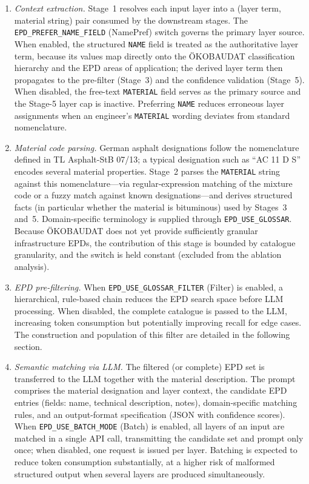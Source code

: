 \documentclass[10pt, a4paper, twocolumn]{article}
\begin{document}
\begin{enumerate}[leftmargin=*, itemsep=3pt, topsep=3pt, label=\arabic*.]

\item \textit{Context extraction.} Stage~1 resolves each input layer into a
(layer term, material string) pair consumed by the downstream stages. The
\texttt{EPD\_PREFER\_NAME\_FIELD} (NamePref) switch governs the primary layer
source. When enabled, the structured \texttt{NAME} field is treated as the
authoritative layer term, because its values map directly onto the
\"OKOBAUDAT classification hierarchy and the EPD areas of application; the
derived layer term then propagates to the pre-filter (Stage~3) and the
confidence validation (Stage~5). When disabled, the free-text \texttt{MATERIAL}
field serves as the primary source and the Stage-5 layer cap is inactive.
Preferring \texttt{NAME} reduces erroneous layer assignments when an engineer's
\texttt{MATERIAL} wording deviates from standard nomenclature.

\item \textit{Material code parsing.} German asphalt designations follow the
nomenclature defined in TL Asphalt-StB 07/13; a typical designation such as
``AC 11 D S'' encodes several material properties. Stage~2 parses the
\texttt{MATERIAL} string against this nomenclature---via regular-expression
matching of the mixture code or a fuzzy match against known designations---and
derives structured facts (in particular whether the material is bituminous) used
by Stages~3 and~5. Domain-specific terminology is supplied through
\texttt{EPD\_USE\_GLOSSAR}. Because \"OKOBAUDAT does not yet provide sufficiently
granular infrastructure EPDs, the contribution of this stage is bounded by
catalogue granularity, and the switch is held constant (excluded from the
ablation analysis).

\item \textit{EPD pre-filtering.} When \texttt{EPD\_USE\_GLOSSAR\_FILTER} (Filter)
is enabled, a hierarchical, rule-based chain reduces the EPD search space before
LLM processing. When disabled, the complete catalogue is passed to the LLM,
increasing token consumption but potentially improving recall for edge cases. The
construction and population of this filter are detailed in the following
section.

\item \textit{Semantic matching via LLM.} The filtered (or complete) EPD set is
transferred to the LLM together with the material description. The prompt comprises
the material designation and layer context, the candidate EPD entries (fields:
name, technical description, notes), domain-specific matching rules, and an
output-format specification (JSON with confidence scores). When
\texttt{EPD\_USE\_BATCH\_MODE} (Batch) is enabled, all layers of an input are
matched in a single API call, transmitting the candidate set and prompt only once;
when disabled, one request is issued per layer. Batching is expected to reduce
token consumption substantially, at a higher risk of malformed structured output
when several layers are produced simultaneously.


\end{enumerate}
\end{document}
